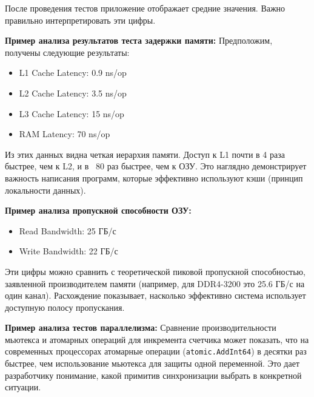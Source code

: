 После проведения тестов приложение отображает средние значения. Важно правильно интерпретировать эти цифры. 

\textbf{Пример анализа результатов теста задержки памяти:}
Предположим, получены следующие результаты:
\begin{itemize}
    \item L1 Cache Latency: 0.9 ns/op
    \item L2 Cache Latency: 3.5 ns/op
    \item L3 Cache Latency: 15 ns/op
    \item RAM Latency: 70 ns/op
\end{itemize}
Из этих данных видна четкая иерархия памяти. Доступ к L1 почти в 4 раза быстрее, чем к L2, и в ~80 раз быстрее, чем к ОЗУ. Это наглядно демонстрирует важность написания программ, которые эффективно используют кэши (принцип локальности данных).

\textbf{Пример анализа пропускной способности ОЗУ:}
\begin{itemize}
    \item Read Bandwidth: 25 ГБ/с
    \item Write Bandwidth: 22 ГБ/с
\end{itemize}
Эти цифры можно сравнить с теоретической пиковой пропускной способностью, заявленной производителем памяти (например, для DDR4-3200 это 25.6 ГБ/с на один канал). Расхождение показывает, насколько эффективно система использует доступную полосу пропускания.

\textbf{Пример анализа тестов параллелизма:}
Сравнение производительности мьютекса и атомарных операций для инкремента счетчика может показать, что на современных процессорах атомарные операции (\texttt{atomic.AddInt64}) в десятки раз быстрее, чем использование мьютекса для защиты одной переменной. Это дает разработчику понимание, какой примитив синхронизации выбрать в конкретной ситуации.
